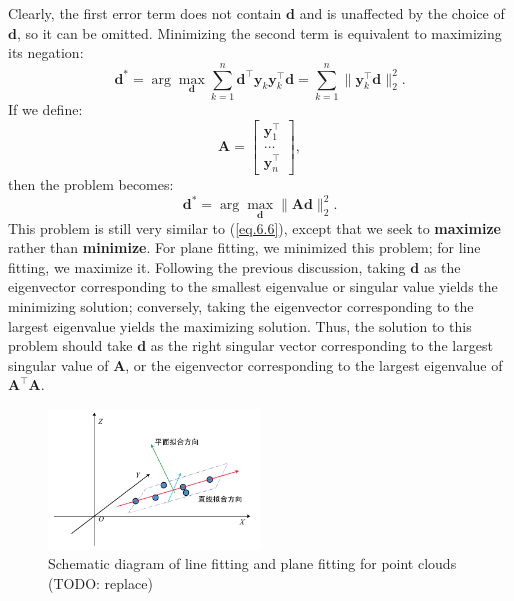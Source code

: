 Clearly, the first error term does not contain $\mathbf{d}$ and is unaffected by the choice of $\mathbf{d}$, so it can be omitted. Minimizing the second term is equivalent to maximizing its negation:
\begin{equation}\label{key}
	\mathbf{d}^* = \arg \max_{\mathbf{d}} \sum_{k=1}^{n} \mathbf{d}^\top \mathbf{y}_k\mathbf{y}_k^\top \mathbf{d} = \sum_{k=1}^{n} \| \mathbf{y}_k^\top \mathbf{d}\|_2^2.
\end{equation}
If we define:
\begin{equation}\label{key}
	\mathbf{A} = \begin{bmatrix}
		\mathbf{y}_1^\top \\
		\ldots \\
		\mathbf{y}_n^\top
	\end{bmatrix},
\end{equation}
then the problem becomes:
\begin{equation}\label{eq.6.33}
	\mathbf{d}^* = \arg \max_{\mathbf{d}} \| \mathbf{A} \mathbf{d} \|_2^2.
\end{equation}
This problem is still very similar to (\ref{eq.6.6}), except that we seek to \textbf{maximize} rather than \textbf{minimize}. For plane fitting, we minimized this problem; for line fitting, we maximize it. Following the previous discussion, taking $\mathbf{d}$ as the eigenvector corresponding to the smallest eigenvalue or singular value yields the minimizing solution; conversely, taking the eigenvector corresponding to the largest eigenvalue yields the maximizing solution. Thus, the solution to this problem should take $\mathbf{d}$ as the right singular vector corresponding to the largest singular value of $\mathbf{A}$, or the eigenvector corresponding to the largest eigenvalue of $\mathbf{A}^\top \mathbf{A}$.

\begin{figure}[!htp]
	\centering
	\includegraphics[width=0.5\textwidth]{resources/basic-point-cloud/linear-fitting.pdf}
	\caption{Schematic diagram of line fitting and plane fitting for point clouds (TODO: replace)}
	\label{fig:linear-fitting}
\end{figure}

